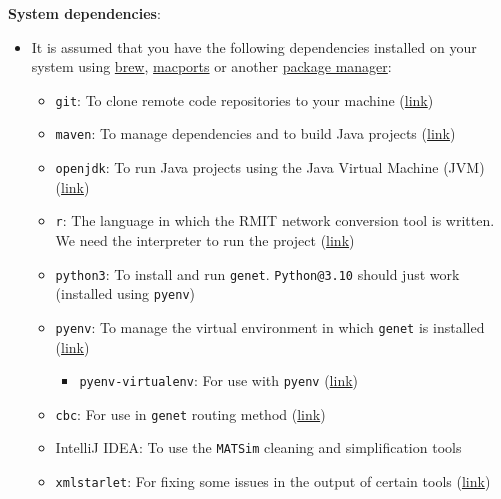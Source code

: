 \documentclass[11pt]{article}
\begin{document}
\textbf{System dependencies}:
\begin{itemize}
\item It is assumed that you have the following dependencies installed on your system using \href{https://brew.sh/}{brew}, \href{https://www.macports.org/install.php}{macports} or another \href{https://en.wikipedia.org/wiki/Package\_manager}{package manager}:
\begin{itemize}
\item \texttt{git}: To clone remote code repositories to your machine (\href{https://formulae.brew.sh/formula/git}{link})
\item \texttt{maven}: To manage dependencies and to build Java projects (\href{https://formulae.brew.sh/formula/maven\#default}{link})
\item \texttt{openjdk}: To run Java projects using the Java Virtual Machine (JVM) (\href{https://formulae.brew.sh/formula/openjdk\#default}{link})
\item \texttt{r}: The language in which the RMIT network conversion tool is written. We need the interpreter to run the project (\href{https://formulae.brew.sh/cask/r\#default}{link})
\item \texttt{python3}: To install and run \texttt{genet}. \texttt{Python@3.10} should just work (installed using \texttt{pyenv})
\item \texttt{pyenv}: To manage the virtual environment in which \texttt{genet} is installed (\href{https://formulae.brew.sh/formula/pyenv\#default}{link})
\begin{itemize}
\item \texttt{pyenv-virtualenv}: For use with \texttt{pyenv} (\href{https://formulae.brew.sh/formula/pyenv-virtualenv\#default}{link})
\end{itemize}
\item \texttt{cbc}: For use in \texttt{genet} routing method (\href{https://formulae.brew.sh/formula/cbc}{link})
\item IntelliJ IDEA: To use the \texttt{MATSim} cleaning and simplification tools
\item \texttt{xmlstarlet}: For fixing some issues in the output of certain tools (\href{https://formulae.brew.sh/formula/xmlstarlet}{link})
\end{itemize}
\end{itemize}
\end{document}
